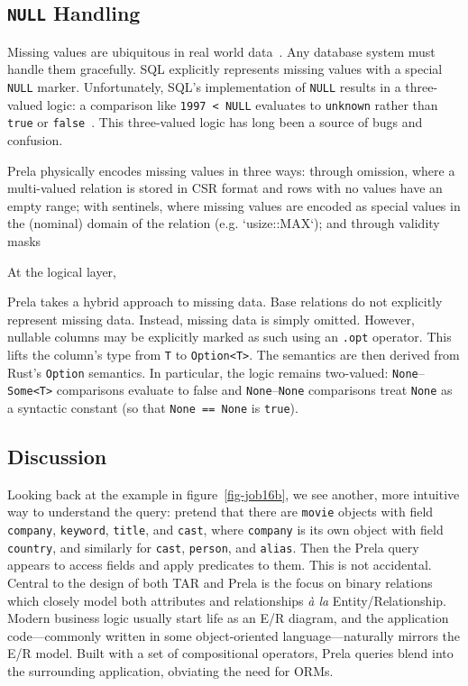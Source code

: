\documentclass[sigconf,screen,pbalance]{cidr-2027}
\newcommand{\noun}[1]{\textsf{#1}}
\newcommand{\code}{\lstinline[style=prela]}
\begin{document}
\subsection{\texorpdfstring{\texttt{NULL}}{NULL} Handling}

Missing values are ubiquitous in real world data~\cite{toussaintTroublesNullsViews2022}.
Any database system must handle them gracefully.
SQL explicitly represents missing values with a special \code|NULL| marker.
Unfortunately, SQL's implementation of \code|NULL| results in a three-valued logic: a comparison like \code|1997 < NULL| evaluates to \code|unknown| rather than \code|true| or \code|false|~\cite{libkinSQLNullsTwoValued2023}.
This three-valued logic has long been a source of bugs and confusion.

Prela physically encodes missing values in three ways: through omission, where a multi-valued relation is stored in CSR format and rows with no values have an empty range; with sentinels, where missing values are encoded as special values in the (nominal) domain of the relation (e.g. `usize::MAX`); and through validity masks

At the logical layer, 

Prela takes a hybrid approach to missing data.
Base relations do not explicitly represent missing data.
Instead, missing data is simply omitted.
However, nullable columns may be explicitly marked as such using an \code|.opt| operator.
This lifts the column's type from \code|T| to \code|Option<T>|.
The semantics are then derived from Rust's \code|Option| semantics.
In particular, the logic remains two-valued: \code|None|--\code|Some<T>| comparisons evaluate to false and \code|None|--\code|None| comparisons treat \code|None| as a syntactic constant (so that \code|None == None| is \code|true|).

\subsection{Discussion}

Looking back at the example in figure~\ref{fig-job16b}, we see another, more intuitive way to understand the query: pretend that there are \code|movie| objects with field \code|company|, \code|keyword|, \code|title|, and \code|cast|, where \code|company| is its own object with field \code|country|, and similarly for \code|cast|, \code|person|, and \code|alias|.
Then the Prela query appears to access fields and apply predicates to them.
This is not accidental.
Central to the design of both \noun{TAR} and Prela is the focus on binary relations which closely model both attributes and relationships \emph{à la} Entity/Relationship.
Modern business logic usually start life as an E/R diagram, and the application code---commonly written in some object-oriented language---naturally mirrors the E/R model.
Built with a set of compositional operators, Prela queries blend into the surrounding application, obviating the need for ORMs.
\end{document}
